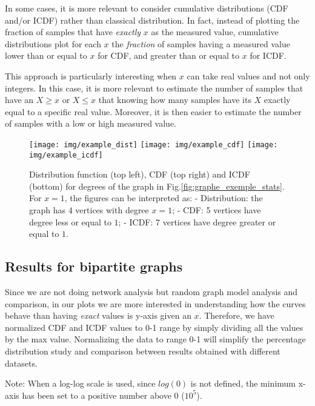 \documentclass[table]{report}
\begin{document}
\bigbreak
In some cases, it is more relevant to consider cumulative distributions (CDF and/or ICDF) rather than classical  distribution. In fact, instead of plotting the fraction of samples that have \textit{exactly} $x$ as the measured value, cumulative distributions plot for each $x$ the \textit{fraction} of samples having a measured value lower than or equal to $x$ for CDF, and greater than or equal to $x$ for ICDF. 

\medbreak
This approach is particularly interesting when $x$ can take real values and not only integers. In this case, it is more relevant to estimate the number of samples that have an  $X \geq x$ or $X \leq x$ that knowing how many samples have its $X$ exactly equal to a specific real value. Moreover, it is then easier to estimate the number of samples with a low or high measured value.\cite{latapy}




\begin{figure}[htp]
\centering
\texttt{[image: img/example\_dist]}\hfill
\texttt{[image: img/example\_cdf]}\hfill
\texttt{[image: img/example\_icdf]}

\caption{Distribution function (top left), CDF (top right) and ICDF (bottom) for degrees of the graph in Fig.\ref{fig:graphe_exemple_stats}. For $x=1$, the figures can be interpreted as: - Distribution: the graph has 4 vertices with degree $x=1$; - CDF: 5 vertices have degree less or equal to $1$; - ICDF: 7 vertices have degree greater or equal to $1$. }
\label{fig:figure3}

\end{figure}

\newpage
\subsection{Results for bipartite graphs}

Since we are not doing network analysis but random graph model analysis and comparison, in our plots we are more interested in understanding how the curves behave than having \textit{exact} values is y-axis given an $x$. Therefore, we have normalized CDF and ICDF values to 0-1 range by simply dividing all the values by the max value. Normalizing the data to range 0-1 will simplify the percentage distribution study and comparison between results obtained with different datasets. 

Note: When a log-log scale is used, since $log(0)$ is not defined, the minimum x-axis has been set to a positive number above 0 ($10^{5}$).
\end{document}
